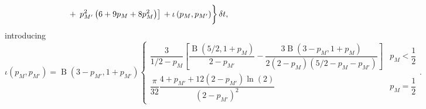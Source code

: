 \documentclass[useAMS,usedcolumn,usegraphicx,usenatbib]{mn2e}
\DeclareMathOperator{\Beta}{B}
\newcommand{\recip}[1]{\ensuremath{\dfrac{1}{#1}}}
\begin{document}
\begin{onecolumn}
\begin{align}
 {} & + \left. \left. p_{M'}^2\left(6 + 9p_M + 8p_M^2\right)\right]  \vphantom{\recip{210}} + \iota \left(p_M,p_{M'}\right) \right\} \delta t,
\end{align}
introducing
\begin{equation}
\iota\left(p_M,p_{M'}\right) = \Beta\left(3-p_{M'},1+p_{M'}\right) \begin{cases} \dfrac{3}{1/2 - p_M}\left[\dfrac{\Beta\left(5/2,1+p_M\right)}{2-p_{M'}} - \dfrac{3\Beta\left(3-p_M,1+p_M\right)}{2\left(2-p_M\right)\left(5/2 - p_M - p_{M'}\right)}\right] & p_M < \recip{2} \\
\dfrac{\pi}{32}\dfrac{4 + p_{M'} + 12 \left(2 - p_{M'}\right) \ln(2)}{\left(2-p_{M'}\right)^2} & p_M = \recip{2} \end{cases}.
\end{equation}


\end{onecolumn}
\end{document}
